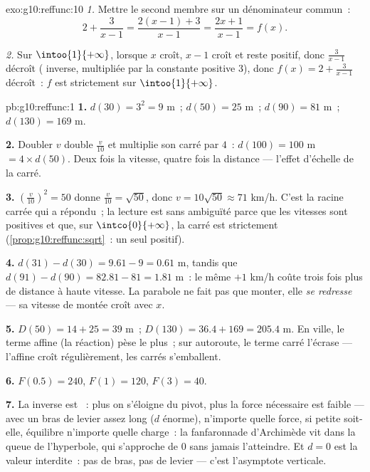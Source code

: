\begin{solution}{exo:g10:reffunc:10}
\emph{1.} Mettre le second membre sur un dénominateur commun~:
\[
2 + \frac{3}{x-1} = \frac{2(x-1) + 3}{x - 1} = \frac{2x + 1}{x - 1}
= f(x).
\]

\emph{2.} Sur $\intoo{1}{+\infty}$, lorsque $x$ croît, $x - 1$ croît et
reste positif, donc $\frac{3}{x-1}$ décroît ( inverse, multipliée
par la constante positive $3$), donc $f(x) = 2 + \frac{3}{x-1}$
décroît~: $f$ est strictement  sur $\intoo{1}{+\infty}$.
\end{solution}

\begin{solution}{pb:g10:reffunc:1}
\textbf{1.} $d(30) = 3^2 = 9$ m~; $d(50) = 25$ m~; $d(90) = 81$ m~;
$d(130) = 169$ m.

\textbf{2.} Doubler $v$ double $\frac v{10}$ et multiplie son carré
par $4$~: $d(100) = 100$ m $= 4 \times d(50)$. Deux fois la vitesse,
quatre fois la distance --- l'effet d'échelle de la  carré.

\textbf{3.} $\left(\frac{v}{10}\right)^2 = 50$ donne
$\frac{v}{10} = \sqrt{50}$, donc $v = 10\sqrt{50} \approx 71$ km/h.
C'est la racine carrée qui a répondu~; la lecture est sans ambiguïté
parce que les vitesses sont positives et que, sur
$\intco{0}{+\infty}$, la  carré est strictement 
(\cref{prop:g10:reffunc:sqrt}~: un seul  positif).

\textbf{4.} $d(31) - d(30) = 9.61 - 9 = 0.61$ m, tandis que
$d(91) - d(90) = 82.81 - 81 = 1.81$ m~: le même $+1$ km/h coûte trois
fois plus de distance à haute vitesse. La parabole ne fait pas que
monter, elle \emph{se redresse} --- sa vitesse de montée croît avec
$x$.

\textbf{5.} $D(50) = 14 + 25 = 39$ m~; $D(130) = 36.4 + 169 =
205.4$ m. En ville, le terme affine (la réaction) pèse le plus~; sur
autoroute, le terme carré l'écrase --- l'affine croît régulièrement,
les carrés s'emballent.

\textbf{6.} $F(0.5) = 240$, $F(1) = 120$, $F(3) = 40$.

\textbf{7.} La  inverse est ~: plus on s'éloigne
du pivot, plus la force nécessaire est faible --- avec un bras de
levier assez long ($d$ énorme), n'importe quelle force, si petite
soit-elle, équilibre n'importe quelle charge~: la fanfaronnade
d'Archimède vit dans la queue de l'hyperbole, qui s'approche de $0$
sans jamais l'atteindre. Et $d = 0$ est la valeur interdite~: pas de
bras, pas de levier --- c'est l'asymptote verticale.


\end{solution}

